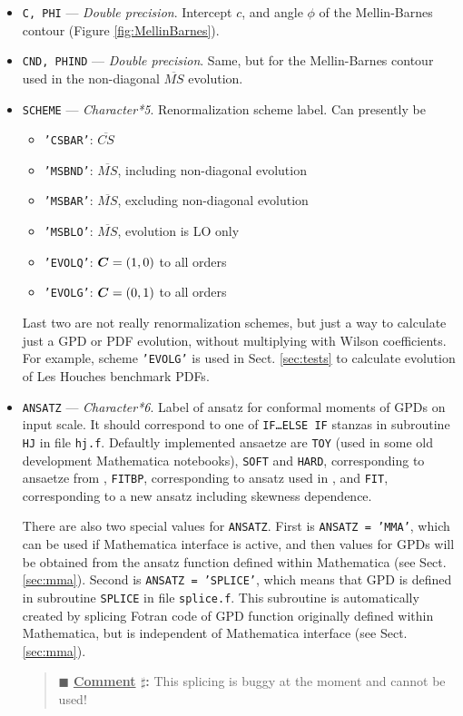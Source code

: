 \documentclass[12pt]{article}
\newcounter{comment}
\newenvironment{commblock}%
{\refstepcounter{comment}%
\begin{quote}\renewcommand{\baselinestretch}{1}
\ttfamily\small$\blacksquare$ \textbf{\underline{Comment} $\sharp$\thecomment:}}%
{\end{quote}}
\begin{document}
\begin{itemize}
\item
\texttt{C, PHI} --- \emph{Double precision}. Intercept $c$, and angle $\phi$ of
the Mellin-Barnes contour (Figure \ref{fig:MellinBarnes}).

\item
\texttt{CND, PHIND} --- \emph{Double precision}. Same, but for 
the Mellin-Barnes contour used in the non-diagonal $\overline{MS}$ evolution.

\item
\texttt{SCHEME} --- \emph{Character*5}. Renormalization scheme label. 
Can presently be 
\begin{itemize}
\item \texttt{'CSBAR'}: $\overline{CS}$
\item \texttt{'MSBND'}: $\overline{MS}$, including non-diagonal evolution
\item \texttt{'MSBAR'}: $\overline{MS}$, excluding non-diagonal evolution
\item \texttt{'MSBLO'}: $\overline{MS}$, evolution is LO only
\item \texttt{'EVOLQ'}: $\mbox{\boldmath $C$} = (1,0)$ to all orders
\item \texttt{'EVOLG'}: $\mbox{\boldmath $C$} = (0,1)$ to all orders
\end{itemize}
Last two are not really renormalization schemes, but just a way to calculate
just a GPD or PDF evolution, without multiplying with Wilson coefficients.
For example, scheme \texttt{'EVOLG'} is used in Sect. \ref{sec:tests} to calculate
evolution of Les Houches benchmark PDFs.

\item
\texttt{ANSATZ} --- \emph{Character*6}. Label of ansatz for conformal moments of GPDs on input scale. 
It should correspond to one of  \texttt{IF\ldots ELSE IF} stanzas in subroutine
\texttt{HJ} in file \texttt{hj.f}. Defaultly implemented ansaetze are
\texttt{TOY} (used in some old development Mathematica notebooks), \texttt{SOFT} and \texttt{HARD},
corresponding to ansaetze from \cite{Kumericki:2006xx}, \texttt{FITBP}, corresponding
to ansatz used in \cite{Kumericki:2007sa}, and \texttt{FIT}, corresponding to a new
ansatz including skewness dependence.

There are also two special values for \texttt{ANSATZ}. First is \texttt{ANSATZ = 'MMA'}, which
can be used if Mathematica interface is active, and
then values for GPDs will be obtained from the ansatz function defined within
Mathematica (see Sect. \ref{sec:mma}). Second is \texttt{ANSATZ = 'SPLICE'}, which
means that GPD is defined in subroutine \texttt{SPLICE} in file \texttt{splice.f}. This
subroutine is automatically created by splicing Fotran code of GPD function originally
defined within Mathematica, but is independent of Mathematica interface (see Sect. \ref{sec:mma}).

\begin{commblock}
This splicing is buggy at the moment and cannot be used!
\end{commblock}

\end{itemize}
\end{document}
